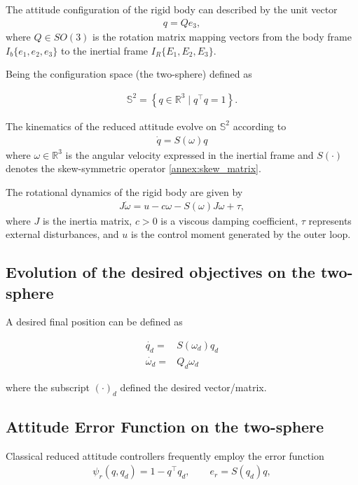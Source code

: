 The attitude configuration of the rigid body can described by the unit vector
\begin{align}
q = Q e_3,
\end{align}
where \( Q \in SO(3) \) is the rotation matrix mapping vectors from the body frame $I_b\{e_1, e_2, e_3\}$ to the inertial frame $I_R\{E_1, E_2, E_3\}$.

Being the configuration space (the two-sphere) defined as

\begin{align}
\mathbb{S}^2 = \left\{ q \in \mathbb{R}^3 \mid q^\top q = 1 \right\}.
\end{align}

The kinematics of the reduced attitude evolve on $\mathbb{S}^2$ according to
\begin{align}
\dot{q} = S(\omega) q
\end{align}
where \( \omega \in \mathbb{R}^3 \) is the angular velocity expressed in the inertial frame and \( S(\cdot) \) denotes the skew-symmetric operator \ref{annex:skew_matrix}.

The rotational dynamics of the rigid body are given by
\begin{align}
J \dot{\omega} = u - c \omega - S(\omega) J \omega + \tau,
\end{align}
where \( J \) is the inertia matrix, \( c > 0 \) is a viscous damping coefficient, \( \tau \) represents external disturbances, and \( u \) is the control moment generated by the outer loop.

\subsection{Evolution of the desired objectives on the two-sphere}

A desired final position can be defined as

\begin{align}
    \dot{q_d} =& S(\omega_d) q_d  \\
    \dot{\omega_d} =& Q_d \omega_d
\end{align}

where the subscript $({\cdot})_d$ defined the desired vector/matrix.

\subsection{Attitude Error Function on the two-sphere}

Classical reduced attitude controllers frequently employ the error function
\begin{align}
\psi_r(q, q_d) = 1 - q^\top q_d,
\qquad
e_r = S(q_d) q,
\end{align}

